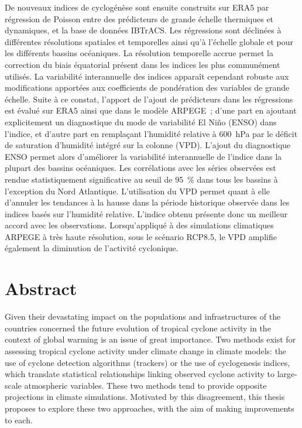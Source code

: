 \documentclass[12pt,twoside,openright]{book}
\newcommand{\hPa}[1]{\SI{#1}{\hecto\pascal}}
\newcommand{\prct}[1]{\SI{#1}{\percent}}
\begin{document}
De nouveaux indices de cyclogénèse sont ensuite construits sur ERA5 par régression de Poisson entre des prédicteurs de grande échelle thermiques et dynamiques,
et la base de données IBTrACS. Les régressions sont déclinées à différentes résolutions spatiales et temporelles ainsi qu’à l’échelle globale et pour les
différents bassins océaniques. La résolution temporelle accrue permet la correction du biais équatorial présent dans les indices les plus communément utilisés.
La variabilité interannuelle des indices apparaît cependant robuste aux modifications apportées aux coefficients de pondération des variables de grande échelle.
Suite à ce constat, l’apport de l’ajout de prédicteurs dans les régressions est évalué sur ERA5 ainsi que dans le modèle ARPEGE ; d’une part en ajoutant
explicitement un diagnostique du mode de variabilité El Niño (ENSO) dans l’indice, et d’autre part en remplaçant l’humidité relative à \hPa{600} par le déficit
de saturation d’humidité intégré sur la colonne (VPD). L’ajout du diagnostique ENSO permet alors d’améliorer la variabilité interannuelle de l’indice dans la
plupart des bassins océaniques. Les corrélations avec les séries observées est rendue statistiquement significative au seuil de \prct{95} dans tous les bassins
à l’exception du Nord Atlantique. L’utilisation du VPD permet quant à elle d’annuler les tendances à la hausse dans la période historique observée dans les
indices basés sur l’humidité relative. L’indice obtenu présente donc un meilleur accord avec les observations. Lorsqu’appliqué à des simulations climatiques
ARPEGE à très haute résolution, sous le scénario RCP8.5, le VPD amplifie également la diminution de l’activité cyclonique.

\chapter*{Abstract}

Given their devastating impact on the populations and infrastructures of the countries concerned the future evolution of tropical cyclone activity in the
context of global warming is an issue of great importance. Two methods exist for assessing tropical cyclone activity under climate change in climate models: the
use of cyclone detection algorithms (trackers) or the use of cyclogenesis indices, which translate statistical relationships linking observed cyclone activity
to large-scale atmospheric variables. These two methods tend to provide opposite projections in climate simulations. Motivated by this disagreement, this thesis
proposes to explore these two approaches, with the aim of making improvements to each.
\end{document}

